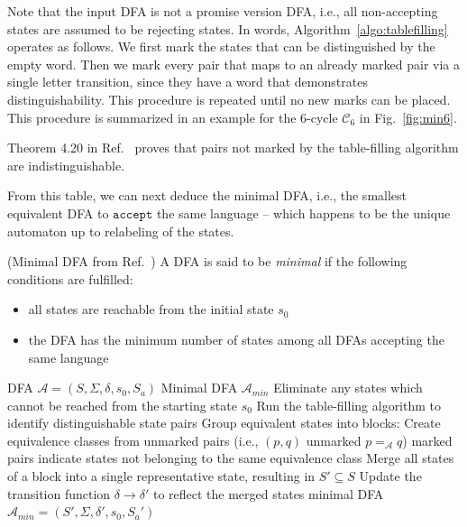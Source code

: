 \documentclass[../main.tex]{subfiles}
\begin{document}
Note that the input \ac{DFA} is not a promise version \ac{DFA}, i.e., all non-accepting states are assumed to be rejecting states. In words, Algorithm~\ref{algo:tablefilling} operates as follows. We first mark the states that can be distinguished by the empty word. Then we mark every pair that maps to an already marked pair via a single letter transition, since they have a word that demonstrates distinguishability. This procedure is repeated until no new marks can be placed. This procedure is summarized in an example for the 6-cycle $\mathcal{C}_6$ in Fig.~\ref{fig:min6}.

Theorem 4.20 in Ref.~\cite{hopcroft2001introduction} proves that pairs not marked by the table-filling algorithm are indistinguishable.


From this table, we can next deduce the minimal \ac{DFA}, i.e., the smallest equivalent \ac{DFA} to $\mathtt{accept}$ the same language -- which happens to be the unique automaton up to relabeling of the states. 

\begin{definition} (Minimal DFA from Ref.~\cite{hopcroft2001introduction})
 A DFA is said to be \textit{minimal} if the following conditions are fulfilled:
\begin{itemize}
    \item all states are reachable from the initial state $s_0$
    \item the DFA has the minimum number of states among all DFAs accepting the same language
\end{itemize}
\end{definition}


\begin{algorithm}
\caption{DFA Minimization alias Hopcroft's Algorithm (adopted from Ref.~\cite{hopcroft2001introduction})}
\label{alg:dfamin}
\begin{algorithmic}[1]
\REQUIRE DFA $\mathcal{A} = (S, \Sigma, \delta, s_0, S_a)$
\ENSURE Minimal DFA $\mathcal{A}_{min}$
\STATE Eliminate any states which cannot be reached from the starting state $s_0$
\STATE Run the table-filling algorithm to identify distinguishable state pairs
\STATE Group equivalent states into blocks:
\STATE \quad Create equivalence classes from unmarked pairs (i.e., $(p,q)$ unmarked $p =_{\mathcal{A}} q$) 
\STATE \quad marked pairs indicate states not belonging to the same equivalence class
    \STATE Merge all states of a block into a single representative state, resulting in $S' \subseteq S$
\ENDFOR
\STATE Update the transition function $\delta \rightarrow \delta'$ to reflect the merged states
\STATE \RETURN minimal DFA $\mathcal{A}_{min} = (S', \Sigma, \delta', s_0, S_a')$
\end{algorithmic}
\end{algorithm}
\end{document}
